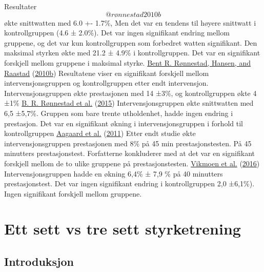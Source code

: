 \documentclass[
]{book}
\begin{document}
Resultater \[@rønnestad2010b\] økte snittwatten med 6.0 +- 1.7\%, Men
det var en tendens til høyere snittwatt i kontrollgruppen (4.6 ± 2.0\%).
Det var ingen signifikant endring mellom gruppene, og det var kun
kontrollgruppen som forbedret watten signifikant. Den maksimal styrken
økte med 21.2 ± 4.9\% i kontrollgruppen. Det var en signifikant
forskjell mellom gruppene i maksimal styrke.
\protect\hyperlink{ref-ruxf8nnestad2010a}{Bent R. Rønnestad, Hansen, and
Raastad} (\protect\hyperlink{ref-ruxf8nnestad2010a}{2010b}) Resultatene
viser en signifikant forskjell mellom intervensjonsgruppen og
kontrollgruppen etter endt intervensjon. Intervensjonsgruppen økte
prestasjonen med 14 ±3\%, og kontrollgruppen økte 4 ±1\%
\protect\hyperlink{ref-ruxf8nnestad2015}{B. R. Rønnestad et al.}
(\protect\hyperlink{ref-ruxf8nnestad2015}{2015}) Intervensjonsgruppen
økte snittwatten med 6,5 ±5,7\%. Gruppen som bare trente utholdenhet,
hadde ingen endring i prestasjon. Det var en signifikant økning i
intervensjonsgruppen i forhold til kontrollgruppen
\protect\hyperlink{ref-aagaard2011}{Aagaard et al.}
(\protect\hyperlink{ref-aagaard2011}{2011}) Etter endt studie økte
intervensjonsgruppen prestasjonen med 8\% på 45 min prestasjonstesten.
På 45 minutters prestasjonstest. Forfatterne konkluderer med at det var
en signifikant forskjell mellom de to ulike gruppene på
prestasjonstesten. \protect\hyperlink{ref-vikmoen2016}{Vikmoen et al.}
(\protect\hyperlink{ref-vikmoen2016}{2016}) Intervensjonsgruppen hadde
en økning 6,4\% ± 7,9 \% på 40 minutters prestasjonstest. Det var ingen
signifikant endring i kontrollgruppen 2,0 ±6,1\%). Ingen signifikant
forskjell mellom gruppene.

\hypertarget{ett-sett-vs-tre-sett-styrketrening}{%
\chapter{Ett sett vs tre sett
styrketrening}\label{ett-sett-vs-tre-sett-styrketrening}}

\hypertarget{introduksjon-1}{%
\section{Introduksjon}\label{introduksjon-1}}
\end{document}
